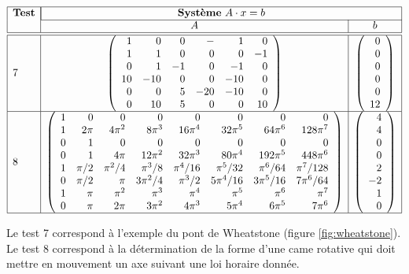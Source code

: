 $$\begin{array}{|l|c|c|}
\hline
\mbox{\bf Test} & \multicolumn{2}{|c|}{\mbox{{\bf Système} $A\cdot x = b$}}\\
\cline{2-3}
                & A & b  \\
\hline
\hline
7 &
\left(\begin{array}{rrrrrr}
1 & 0 & 0 & - & 1 & 0\\
1 & 1 & 0 & 0 & 0 & -1\\
0 & 1 & -1 & 0 & -1 & 0\\
10 & -10 & 0 & 0 & -10 & 0\\
0 & 0 & 5 & -20 & -10 & 0\\
0 & 10 & 5 & 0 & 0 & 10
\end{array}\right) 
&
\left(\begin{array}{r}
0 \\ 0 \\ 0 \\ 0 \\ 0 \\ 12
\end{array}\right)\\
\hline
8 &
\left(\begin{array}{rrrrrrrr}
1 & 0 & 0 & 0 & 0 & 0 & 0 & 0\\
1 & 2\pi & 4\pi^2 & 8\pi^3 & 16\pi^4 & 32\pi^5 & 64\pi^6 & 128\pi^7\\
0 & 1 & 0 & 0 & 0 & 0 & 0 & 0\\
0 & 1 & 4\pi & 12\pi^2 & 32\pi^3 & 80\pi^4 & 192\pi^5 & 448\pi^6\\
1 & \pi/2 & \pi^2/4 & \pi^3/8 & \pi^4/16 & \pi^5/32 & \pi^6/64 & \pi^7/128\\
0 & \pi/2 & \pi & 3\pi^2/4 & \pi^3/2 & 5\pi^4/16 & 3\pi^5/16 & 7\pi^6/64\\
1 & \pi & \pi^2 & \pi^3 & \pi^4 & \pi^5 & \pi^6 & \pi^7\\
0 & \pi & 2\pi & 3\pi^2 & 4\pi^3 & 5\pi^4 & 6\pi^5 & 7\pi^6
\end{array}\right) 
&
\left(\begin{array}{r}
4 \\ 4 \\ 0 \\ 0 \\ 2 \\ -2 \\ 1 \\ 0
\end{array}\right)\\
\hline
\end{array}$$


Le test 7 correspond à l'exemple du pont de Wheatstone 
(figure \ref{fig:wheatstone}). Le test 8 correspond
à la détermination de la forme d'une came rotative qui doit
mettre en mouvement un axe suivant une loi horaire donnée.
